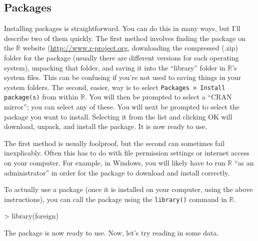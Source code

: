 \documentclass[12pt]{article}
\begin{document}
\subsection{Packages}
Installing packages is straightforward. You can do this in many ways, but I'll describe two of them quickly. The first method involves finding the package on the $\mathbb{R}$ website (\url{http://www.r-project.org}, downloading the compressed (.zip) folder for the package (usually there are different versions for each operating system), unpacking that folder, and saving it into the ``library'' folder in $\mathbb{R}$'s system files. This can be confusing if you're not used to saving things in your system folders. The second, easier, way is to select \verb|Packages > Install package(s)| from within $\mathbb{R}$. You will then be prompted to select a ``CRAN mirror''; you can select any of these. You will next be prompted to select the package you want to install. Selecting it from the list and clicking OK will download, unpack, and install the package. It is now ready to use.

The first method is usually foolproof, but the second can sometimes fail inexplicably. Often this has to do with file permission settings or internet access on your computer. For example, in Windows, you will likely have to run $\mathbb{R}$ ``as an administrator'' in order for the package to download and install correctly.

To actually use a package (once it is installed on your computer, using the above instructions), you can call the package using the \verb|library()| command in $\mathbb{R}$.
\begin{Schunk}
\begin{Sinput}
> library(foreign)
\end{Sinput}
\end{Schunk}
The package is now ready to use. Now, let's try reading in some data.
\end{document}
